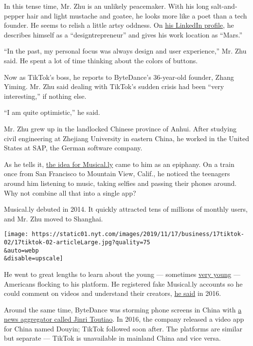 In this tense time, Mr. Zhu is an unlikely peacemaker. With his long
salt-and-pepper hair and light mustache and goatee, he looks more like a
poet than a tech founder. He seems to relish a little artsy oddness. On
\href{https://www.linkedin.com/in/keepsilence/}{his LinkedIn profile},
he describes himself as a ``designtrepreneur'' and gives his work
location as ``Mars.''

``In the past, my personal focus was always design and user
experience,'' Mr. Zhu said. He spent a lot of time thinking about the
colors of buttons.

Now as TikTok's boss, he reports to ByteDance's 36-year-old founder,
Zhang Yiming. Mr. Zhu said dealing with TikTok's sudden crisis had been
``very interesting,'' if nothing else.

``I am quite optimistic,'' he said.

Mr. Zhu grew up in the landlocked Chinese province of Anhui. After
studying civil engineering at Zhejiang University in eastern China, he
worked in the United States at SAP, the German software company.

As he tells it,
\href{https://www.nytimes.com/2016/08/10/technology/china-homegrown-internet-companies-rest-of-the-world.html}{the
idea for Musical.ly} came to him as an epiphany. On a train once from
San Francisco to Mountain View, Calif., he noticed the teenagers around
him listening to music, taking selfies and passing their phones around.
Why not combine all that into a single app?

Musical.ly debuted in 2014. It quickly attracted tens of millions of
monthly users, and Mr. Zhu moved to Shanghai.

\texttt{[image: https://static01.nyt.com/images/2019/11/17/business/17tiktok-02/17tiktok-02-articleLarge.jpg?quality=75\\\&auto=webp\\\&disable=upscale]}

He went to great lengths to learn about the young --- sometimes
\href{https://www.nytimes.com/2016/09/17/business/media/a-social-network-frequented-by-children-tests-the-limits-of-online-regulation.html}{very
young} --- Americans flocking to his platform. He registered fake
Musical.ly accounts so he could comment on videos and understand their
creators, \href{https://www.youtube.com/watch?v=wTyg2E44pBA}{he said} in
2016.

Around the same time, ByteDance was storming phone screens in China with
\href{https://www.nytimes.com/2018/01/02/business/china-toutiao-censorship.html}{a
news aggregator called Jinri Toutiao}. In 2016, the company released a
video app for China named Douyin; TikTok followed soon after. The
platforms are similar but separate --- TikTok is unavailable in mainland
China and vice versa.

